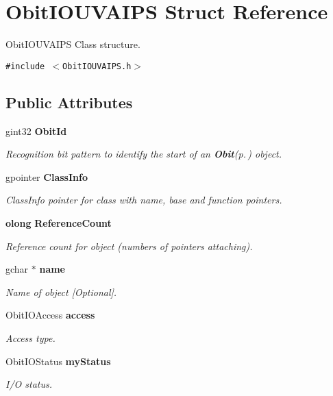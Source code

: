 \section{Obit\-IOUVAIPS Struct Reference}
\label{structObitIOUVAIPS}
Obit\-IOUVAIPS Class structure.  


{\tt \#include $<$Obit\-IOUVAIPS.h$>$}

\subsection*{Public Attributes}
\begin{CompactItemize}
\item 
gint32 {\bf Obit\-Id}
\begin{CompactList}\small\item\em Recognition bit pattern to identify the start of an {\bf Obit}{\rm (p.\,\pageref{structObit})} object. \item\end{CompactList}\item 
gpointer {\bf Class\-Info}
\begin{CompactList}\small\item\em Class\-Info pointer for class with name, base and function pointers. \item\end{CompactList}\item 
{\bf olong} {\bf Reference\-Count}
\begin{CompactList}\small\item\em Reference count for object (numbers of pointers attaching). \item\end{CompactList}\item 
gchar $\ast$ {\bf name}
\begin{CompactList}\small\item\em Name of object [Optional]. \item\end{CompactList}\item 
Obit\-IOAccess {\bf access}
\begin{CompactList}\small\item\em Access type. \item\end{CompactList}\item 
Obit\-IOStatus {\bf my\-Status}
\begin{CompactList}\small\item\em I/O status. \item\end{CompactList}\item 

\end{CompactItemize}
